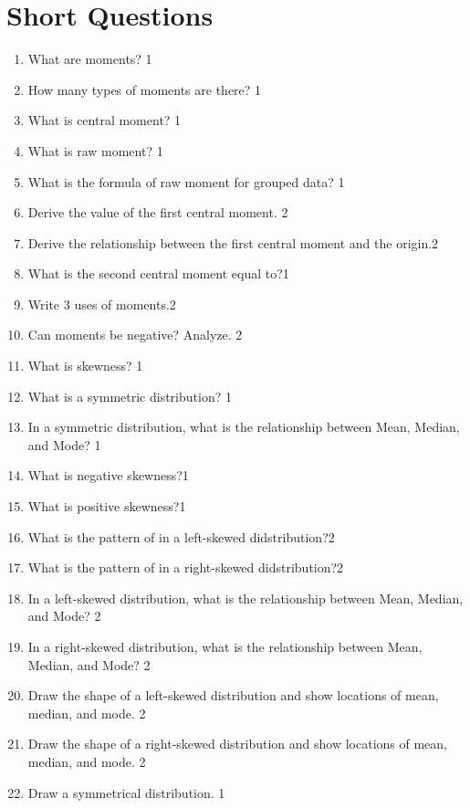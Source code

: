 \documentclass[a4paper,oneside]{book}
\begin{document}
\section{Short Questions}
\begin{enumerate}
    \item What are moments? \hfill 1
    \item How many types of moments are there?  \hfill 1
    \item What is central moment? \hfill 1
    \item  What is raw moment? \hfill 1
    \item  What is the formula of raw moment for grouped data? \hfill 1
    \item Derive the value of the first central moment. \hfill 2
    \item  Derive the relationship between the first central moment and the origin.\hfill 2
    \item What is the second central moment equal to?\hfill 1
    \item Write 3 uses of moments.\hfill 2
    \item Can moments be negative? Analyze. \hfill 2
    \item What is skewness? \hfill 1
    \item What is a symmetric distribution? \hfill 1
    \item In a symmetric distribution, what is the relationship between Mean, Median, and Mode? \hfill 1
    \item What is negative skewness?\hfill 1
    \item What is positive skewness?\hfill 1
    \item What is the pattern of in a left-skewed didstribution?\hfill 2
    \item What is the pattern of in a right-skewed didstribution?\hfill 2
    \item In a left-skewed distribution, what is the relationship between Mean, Median, and Mode? \hfill 2
    \item In a right-skewed distribution, what is the relationship between Mean, Median, and Mode?  \hfill 2
    \item Draw the shape of a left-skewed distribution and show locations of mean, median, and mode.  \hfill 2
    \item Draw the shape of a right-skewed distribution and show locations of mean, median, and mode.  \hfill 2
    \item Draw a symmetrical distribution.   \hfill 1

\end{enumerate}
\end{document}
